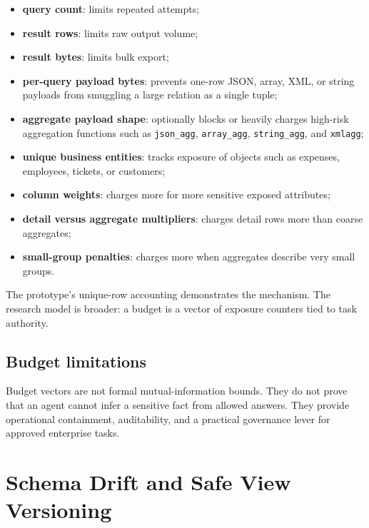 \documentclass[
]{article}
\providecommand{\tightlist}{%
  \setlength{\itemsep}{0pt}\setlength{\parskip}{0pt}}
\begin{document}
\begin{itemize}
\tightlist
\item
  \textbf{query count}: limits repeated attempts;
\item
  \textbf{result rows}: limits raw output volume;
\item
  \textbf{result bytes}: limits bulk export;
\item
  \textbf{per-query payload bytes}: prevents one-row JSON, array, XML,
  or string payloads from smuggling a large relation as a single tuple;
\item
  \textbf{aggregate payload shape}: optionally blocks or heavily charges
  high-risk aggregation functions such as \texttt{json\_agg},
  \texttt{array\_agg}, \texttt{string\_agg}, and \texttt{xmlagg};
\item
  \textbf{unique business entities}: tracks exposure of objects such as
  expenses, employees, tickets, or customers;
\item
  \textbf{column weights}: charges more for more sensitive exposed
  attributes;
\item
  \textbf{detail versus aggregate multipliers}: charges detail rows more
  than coarse aggregates;
\item
  \textbf{small-group penalties}: charges more when aggregates describe
  very small groups.
\end{itemize}

The prototype's unique-row accounting demonstrates the mechanism. The
research model is broader: a budget is a vector of exposure counters
tied to task authority.

\hypertarget{budget-limitations}{%
\subsection{Budget limitations}\label{budget-limitations}}

Budget vectors are not formal mutual-information bounds. They do not
prove that an agent cannot infer a sensitive fact from allowed answers.
They provide operational containment, auditability, and a practical
governance lever for approved enterprise tasks.


\hypertarget{schema-drift-and-safe-view-versioning}{%
\section{Schema Drift and Safe View
Versioning}\label{schema-drift-and-safe-view-versioning}}
\end{document}
